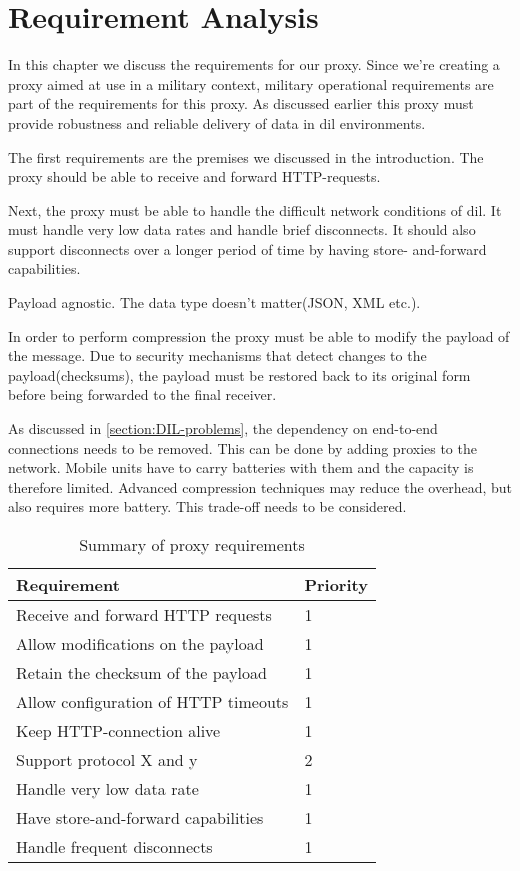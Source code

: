 \chapter{Requirement Analysis}

In this chapter we discuss the requirements for our proxy. Since we're creating
a proxy aimed at use in a military context, military operational requirements
are part of the requirements for this proxy. As discussed earlier this proxy
must provide robustness and reliable delivery of data in \gls{dil} environments.

The first requirements are the premises we discussed in the introduction. The
proxy should be able to receive and forward HTTP-requests.

Next, the proxy must be able to handle the difficult network conditions of
dil. It must handle very low data rates and handle brief disconnects. It
should also support disconnects over a longer period of time by having store-
and-forward capabilities.

Payload agnostic. The data type doesn't matter(JSON, XML etc.).

In order to perform compression the proxy must be able to modify the payload
of the message. Due to security mechanisms that detect changes to the
payload(checksums), the payload must be restored back to its original form
before being forwarded to the final receiver.

As discussed in \cref{section:DIL-problems}, the dependency on end-to-end
connections needs to be removed. This can be done by adding proxies to the
network. Mobile units have to carry batteries with them and the capacity is
therefore limited. Advanced compression techniques may reduce the overhead,
but also requires more battery. This trade-off needs to be considered.


\begin{table}[h]
\begin{tabular}{| l | l |}
\hline
  \textbf{Requirement} & \textbf{Priority} \\ \hline
  Receive and forward HTTP requests & 1\\ \hline
  Allow modifications on the payload & 1 \\ \hline
  Retain the checksum of the payload & 1 \\ \hline
  Allow configuration of HTTP timeouts & 1 \\ \hline
  Keep HTTP-connection alive & 1 \\ \hline
  Support protocol X and y & 2 \\ \hline
  Handle very low data rate & 1 \\ \hline
  Have store-and-forward capabilities & 1 \\ \hline
  Handle frequent disconnects & 1\\ \hline
\end{tabular}
\caption{Summary of proxy requirements}
\end{table}


